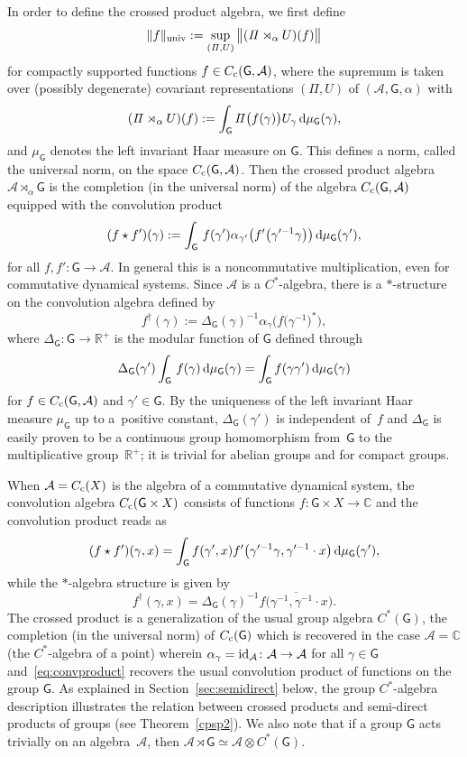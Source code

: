\documentclass[pdftex]{sigma}
\numberwithin{equation}{section}
\def\dd{{\rm d}}
\newcommand{\sfG}{\mathsf{G}}
\newcommand{\Pim}{{\mathit\Pi}}
\newcommand{\complex}{{\mathbb C}} %
\newcommand{\real}{{\mathbb R}} %
\def\alg{{\mathcal A}}
\begin{document}
In order to define the crossed product
algebra, we first define
\[
\|f\|_{\rm univ} := \sup_{({\mathit\Pi},U)} \big\|({\mathit\Pi}\rtimes_\alpha U)(f)\big\|
\]
for compactly supported functions $f\in C_{\rm c}(\sfG,\alg) $, where the supremum is taken
over (possibly degenerate) covariant representations
$({\mathit\Pi},U)$ of $(\alg, \sfG, \alpha)$ with
\[
(\Pim\rtimes_\alpha U)(f) := \int_\sfG
\Pim\big(f(\gamma)\big) U_\gamma\, \dd\mu_\sfG(\gamma) ,
\]
and $\mu_\sfG$ denotes the left invariant Haar measure on $\sfG$. This defines a norm, called the universal norm, on the
space $C_{\rm c}(\sfG,\alg)$.
Then the crossed product algebra $\alg\rtimes_\alpha \sfG$ is the
completion (in the universal norm) of the algebra $C_{\rm c}(\sfG,\alg)$
equipped with the convolution product
\begin{gather}\label{eq:convproduct}
(f\star f')(\gamma) := \int_\sfG\, f(\gamma') \alpha_{\gamma'}\big(f'\big(\gamma'^{-1} \gamma\big)\big)\, \dd \mu_\sfG(\gamma')
,
\end{gather}
for all $f,f'\colon \sfG\to\alg$. In general this is a noncommutative
multiplication, even for commutative dynamical systems.
Since $\alg$ is a $C^*$-algebra, there is a $*$-structure on the
convolution algebra defined by
\[
f^\dag(\gamma):= \Delta_\sfG(\gamma)^{-1} \alpha_\gamma\big(f\big(\gamma^{-1}\big)^*\big) ,
\]
where $\Delta_\sfG\colon \sfG\to \real^+$ is the modular function of
$\sfG$ defined through
\[
\Delta_\sfG(\gamma')
\int_\sfG\,f(\gamma)\,\dd\mu_\sfG(\gamma)=\int_\sfG f(\gamma \gamma')\,\dd\mu_\sfG(\gamma)
\]
for $f\in C_{\rm c}(\sfG,\alg)$ and $\gamma'\in \sfG$. By the uniqueness of the left
invariant Haar measure $\mu_\sfG$ up to a~positive
constant, $\Delta_\sfG(\gamma')$ is independent of~$f$
and $\Delta_\sfG$ is easily proven to be a continuous group homomorphism from~$\sfG$ to the
multiplicative group~$\real^+$; it is trivial for abelian groups and for compact
groups.

When $\alg=C_{\rm c}(X)$
is the algebra of a commutative dynamical system, the convolution
algebra $C_{\rm c}(\sfG\times X)$ consists of functions $f\colon\sfG\times X\to\complex$ and the
convolution product reads as
\[
(f\star f')(\gamma,x) = \int_\sfG f(\gamma',x)
f'\big(\gamma'^{-1} \gamma,\gamma'^{-1}\cdot x\big)\, \dd \mu_\sfG(\gamma') ,
\]
while the $*$-algebra structure is given by
\[
f^\dag(\gamma,x) = \Delta_\sfG(\gamma)^{-1} \overline{f\big(\gamma^{-1},\gamma^{-1}\cdot x\big)} .
\]
The crossed product is a generalization of the usual group algebra
$C^*(\sfG)$, the completion (in the universal norm) of $C_{\rm
 c}(\sfG)$ which is recovered in the case $\alg=\complex$
(the $C^*$-algebra of a point)
wherein $\alpha_\gamma={\rm id}_\alg\colon \alg\to \alg$ for all $\gamma\in \sfG$ and~\eqref{eq:convproduct} recovers the usual convolution product of
functions on the group $\sfG$. As explained in
Section~\ref{sec:semidirect} below, the
group $C^*$-algebra description illustrates the relation between crossed
products and semi-direct products of groups (see Theorem~\ref{cpsp2}). We also
note that if a group $\sfG$ acts trivially on an algebra~$\alg$, then
$\alg\rtimes\sfG\simeq\alg\otimes C^*(\sfG)$.
\end{document}
